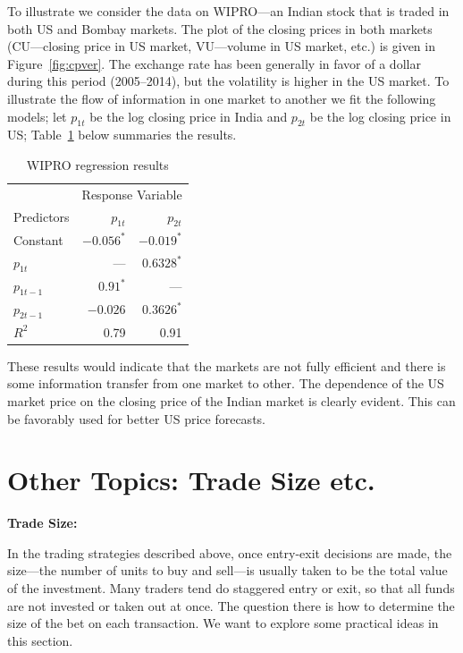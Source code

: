 To illustrate we consider the data on WIPRO---an Indian stock that is traded in both US and Bombay markets. The plot of the closing prices in both markets (CU---closing price in US market, VU---volume in US market, etc.) is given in Figure~\ref{fig:cpver}. The exchange rate has been generally in favor of a dollar during this period (2005--2014), but the volatility is higher in the US market. To illustrate the flow of information in one market to another we fit the following models; let $p_{1t}$ be the log closing price in India and $p_{2t}$ be the log closing price in US; Table~\ref{tab:regresul} below summaries the results.
	\begin{table}[!ht] 
	\centering
	\caption{WIPRO regression results \label{tab:regresul}}
	\begin{tabular}{l | rr} 
	& \multicolumn{2}{c}{Response Variable} \\ 
	Predictors & $p_{1t}$ & $p_{2t}$ \\ \hline 
	Constant & $-0.056^*$ & $-0.019^*$ \\
	$p_{1t}$ & ---  & $0.6328^*$ \\
	$p_{1t-1}$ & $0.91^*$ & --- \\
	$p_{2t-1}$ & $-0.026$ & $0.3626^*$ \\ \hline
	$R^2$ & 0.79 & 0.91 
	\end{tabular}
	\end{table}
These results would indicate that the markets are not fully efficient and there is some information transfer from one market to other. The dependence of the US market price on the closing price of the Indian market is clearly evident. This can be favorably used for better US price forecasts. 



\section{Other Topics: Trade Size etc.}

\noindent \textbf{Trade Size:} \twomedskip

In the trading strategies described above, once entry-exit decisions are made, the size---the number of units to buy and sell---is usually taken to be the total value of the investment. Many traders tend do staggered entry or exit, so that all funds are not invested or taken out at once. The question there is how to determine the size of the bet on each transaction. We want to explore some practical ideas in this section. 


